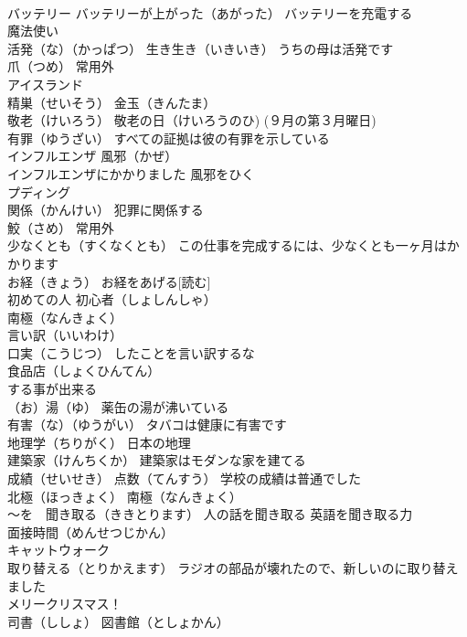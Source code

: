 \documentclass[8pt]{extreport}
\begin{document}
\begin{CJK}{UTF8}{min}
\\	バッテリー バッテリーが上がった（あがった） バッテリーを充電する
\\	魔法使い
\\	活発（な）（かっぱつ） 生き生き（いきいき） うちの母は活発です
\\	爪（つめ） 常用外
\\	アイスランド
\\	精巣（せいそう） 金玉（きんたま）
\\	敬老（けいろう） 敬老の日（けいろうのひ) (９月の第３月曜日)
\\	有罪（ゆうざい） すべての証拠は彼の有罪を示している
\\	インフルエンザ 風邪（かぜ）
\\	インフルエンザにかかりました 風邪をひく
\\	プディング
\\	関係（かんけい） 犯罪に関係する
\\	鮫（さめ） 常用外
\\	少なくとも（すくなくとも） この仕事を完成するには、少なくとも一ヶ月はかかります
\\	お経（きょう） お経をあげる[読む]
\\	初めての人 初心者（しょしんしゃ）
\\	南極（なんきょく）
\\	言い訳（いいわけ）
\\	口実（こうじつ） したことを言い訳するな
\\	食品店（しょくひんてん）
\\	する事が出来る
\\	（お）湯（ゆ） 薬缶の湯が沸いている
\\	有害（な）（ゆうがい） タバコは健康に有害です
\\	地理学（ちりがく） 日本の地理
\\	建築家（けんちくか） 建築家はモダンな家を建てる
\\	成績（せいせき） 点数（てんすう） 学校の成績は普通でした
\\	北極（ほっきょく） 南極（なんきょく）
\\	～を　聞き取る（ききとります） 人の話を聞き取る 英語を聞き取る力
\\	面接時間（めんせつじかん）
\\	キャットウォーク
\\	取り替える（とりかえます） ラジオの部品が壊れたので、新しいのに取り替えました
\\	メリークリスマス！
\\	司書（ししょ） 図書館（としょかん）

\end{CJK}
\end{document}
